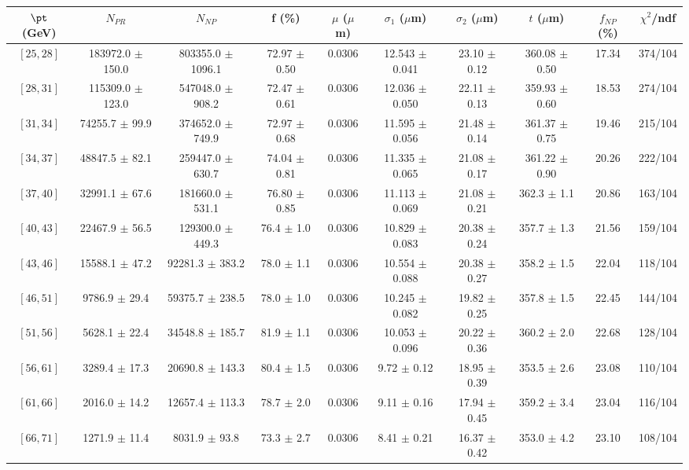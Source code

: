 \begin{tabular}{c||c|c|c|c|c|c|c||c|c}
$\pt$ (GeV) & $N_{PR}$ & $N_{NP}$ & f (\%) & $\mu$ ($\mu$m) & $\sigma_1$ ($\mu$m) & $\sigma_2$ ($\mu$m)  & $t$ ($\mu$m) & $f_{NP}$ (\%) & $\chi^2$/ndf \\
\hline
$[25, 28]$ & 183972.0 $\pm$ 150.0 & 803355.0 $\pm$ 1096.1 & 72.97 $\pm$ 0.50 & 0.0306 & 12.543 $\pm$ 0.041 & 23.10 $\pm$ 0.12 & 360.08 $\pm$ 0.50 & 17.34 & 374/104\\
$[28, 31]$ & 115309.0 $\pm$ 123.0 & 547048.0 $\pm$ 908.2 & 72.47 $\pm$ 0.61 & 0.0306 & 12.036 $\pm$ 0.050 & 22.11 $\pm$ 0.13 & 359.93 $\pm$ 0.60 & 18.53 & 274/104\\
$[31, 34]$ & 74255.7 $\pm$ 99.9 & 374652.0 $\pm$ 749.9 & 72.97 $\pm$ 0.68 & 0.0306 & 11.595 $\pm$ 0.056 & 21.48 $\pm$ 0.14 & 361.37 $\pm$ 0.75 & 19.46 & 215/104\\
$[34, 37]$ & 48847.5 $\pm$ 82.1 & 259447.0 $\pm$ 630.7 & 74.04 $\pm$ 0.81 & 0.0306 & 11.335 $\pm$ 0.065 & 21.08 $\pm$ 0.17 & 361.22 $\pm$ 0.90 & 20.26 & 222/104\\
$[37, 40]$ & 32991.1 $\pm$ 67.6 & 181660.0 $\pm$ 531.1 & 76.80 $\pm$ 0.85 & 0.0306 & 11.113 $\pm$ 0.069 & 21.08 $\pm$ 0.21 & 362.3 $\pm$ 1.1 & 20.86 & 163/104\\
$[40, 43]$ & 22467.9 $\pm$ 56.5 & 129300.0 $\pm$ 449.3 & 76.4 $\pm$ 1.0 & 0.0306 & 10.829 $\pm$ 0.083 & 20.38 $\pm$ 0.24 & 357.7 $\pm$ 1.3 & 21.56 & 159/104\\
$[43, 46]$ & 15588.1 $\pm$ 47.2 & 92281.3 $\pm$ 383.2 & 78.0 $\pm$ 1.1 & 0.0306 & 10.554 $\pm$ 0.088 & 20.38 $\pm$ 0.27 & 358.2 $\pm$ 1.5 & 22.04 & 118/104\\
$[46, 51]$ & 9786.9 $\pm$ 29.4 & 59375.7 $\pm$ 238.5 & 78.0 $\pm$ 1.0 & 0.0306 & 10.245 $\pm$ 0.082 & 19.82 $\pm$ 0.25 & 357.8 $\pm$ 1.5 & 22.45 & 144/104\\
$[51, 56]$ & 5628.1 $\pm$ 22.4 & 34548.8 $\pm$ 185.7 & 81.9 $\pm$ 1.1 & 0.0306 & 10.053 $\pm$ 0.096 & 20.22 $\pm$ 0.36 & 360.2 $\pm$ 2.0 & 22.68 & 128/104\\
$[56, 61]$ & 3289.4 $\pm$ 17.3 & 20690.8 $\pm$ 143.3 & 80.4 $\pm$ 1.5 & 0.0306 & 9.72 $\pm$ 0.12 & 18.95 $\pm$ 0.39 & 353.5 $\pm$ 2.6 & 23.08 & 110/104\\
$[61, 66]$ & 2016.0 $\pm$ 14.2 & 12657.4 $\pm$ 113.3 & 78.7 $\pm$ 2.0 & 0.0306 & 9.11 $\pm$ 0.16 & 17.94 $\pm$ 0.45 & 359.2 $\pm$ 3.4 & 23.04 & 116/104\\
$[66, 71]$ & 1271.9 $\pm$ 11.4 & 8031.9 $\pm$ 93.8 & 73.3 $\pm$ 2.7 & 0.0306 & 8.41 $\pm$ 0.21 & 16.37 $\pm$ 0.42 & 353.0 $\pm$ 4.2 & 23.10 & 108/104\\

\end{tabular}
